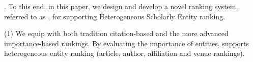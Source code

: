 







.
To this end, in this paper, we design and develop a novel ranking system, referred to as \oursystem, for supporting Heterogeneous Scholarly Entity
ranking.

\noindent (1) We equip \oursystem with both tradition citation-based and the more advanced importance-based rankings. By evaluating the importance of entities, \oursystem supports heterogeneous entity ranking (\ie article, author, affiliation and venue rankings).


